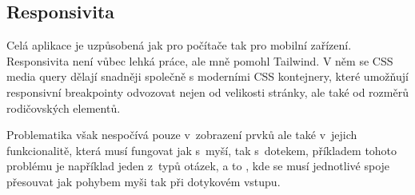 \documentclass[12pt, a4paper,
openright
]{report}
\begin{document}
\subsection{Responsivita}
Celá aplikace je uzpůsobená jak pro počítače tak pro mobilní zařízení. Responsivita není vůbec lehká práce, ale mně pomohl Tailwind. V něm se CSS media query dělají snadněji společně s moderními CSS kontejnery, které umožňují responsivní breakpointy odvozovat nejen od velikosti stránky, ale také od rozměrů rodičovských elementů.

Problematika však nespočívá pouze v~zobrazení prvků ale také v~jejich funkcionalitě, která musí fungovat jak s~myší, tak s~dotekem, příkladem tohoto problému je například jeden z~typů otázek, a to , kde se musí jednotlivé spoje přesouvat jak pohybem myši tak při dotykovém vstupu.
\end{document}
